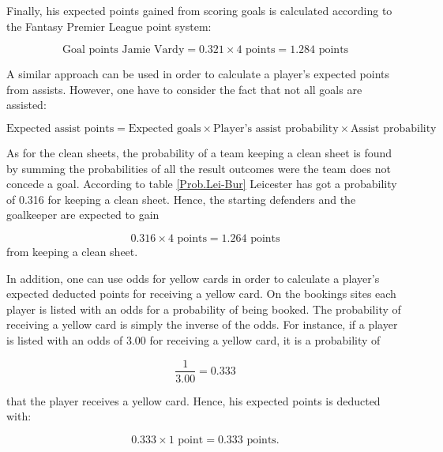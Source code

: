 Finally, his expected points gained from scoring goals is calculated according to the Fantasy Premier League point system: 

\begin{equation*}
    \textrm{Goal points Jamie Vardy} = 0.321 \times \textrm{4 points} = \textrm{1.284 points}
\end{equation*}

A similar approach can be used in order to calculate a player's expected points from assists. However, one have to consider the fact that not all goals are assisted: 

\begin{equation*}
    \textrm{Expected assist points} = \textrm{Expected goals} \times \textrm{Player's assist probability} \times \textrm{Assist probability}
\end{equation*}

As for the clean sheets, the probability of a team keeping a clean sheet is found by summing the probabilities of all the result outcomes were the team does not concede a goal. According to table \ref{Prob.Lei-Bur} Leicester has got a probability of 0.316 for keeping a clean sheet. Hence, the starting defenders and the  goalkeeper are expected to gain

\begin{equation*}
    0.316 \times \textrm{4 points} = \textrm{1.264 points}
\end{equation*}
from keeping a clean sheet. 

\newpar
In addition, one can use odds for yellow cards in order to calculate a player's expected deducted points for receiving a yellow card. On the bookings sites each player is listed with an odds for a probability of being booked. The probability of receiving a yellow card is simply the inverse of the odds. For instance, if a player is listed with an odds of 3.00 for receiving a yellow card, it is a probability of

\begin{equation*}
    \frac{1}{3.00} = 0.333 
\end{equation*}

that the player receives a yellow card. Hence, his expected points is deducted with:

\begin{equation*}
    0.333 \times \textrm{1 point} = \textrm{0.333 points.} 
\end{equation*}

